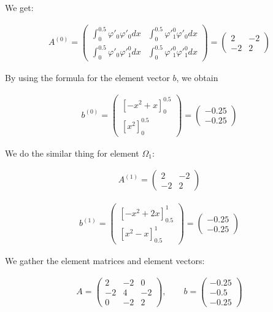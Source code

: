 \documentclass[10pt, a4paper]{amsart}
\numberwithin{figure}{section}
\numberwithin{table}{section}
\begin{document}
We get:

\begin{gather*}
A^{(0)}=
\begin{pmatrix}
\int^{0.5}_{0}\varphi'_0\varphi'_0 dx & \int^{0.5}_{0}\varphi'^0_1\varphi'_0dx\\
    \int^{0.5}_{0}\varphi'_0\varphi'^0_1dx &
    \int^{0.5}_{0}\varphi'^0_1\varphi'^0_1 dx
\end{pmatrix}=
\begin{pmatrix}
2 & -2\\
-2 & 2
\end{pmatrix}
\end{gather*}

By using the formula for the element vector $b$, we obtain

\begin{gather*}
    b^{(0)} = 
    \begin{pmatrix}
        [-x^2 + x]_0^{0.5} \\
        [x^2]_0^{0.5} 
    \end{pmatrix} =
    \begin{pmatrix}
        -0.25\\
        -0.25
    \end{pmatrix}
\end{gather*}


We do the similar thing for element $\Omega_1$:

\begin{gather*}
A^{(1)}=
\begin{pmatrix}
2 & -2\\
-2 & 2
\end{pmatrix}
\end{gather*}

\begin{gather*}
    b^{(1)} = 
    \begin{pmatrix}
        [-x^2 + 2x]_{0.5}^{1} \\
        [x^2 - x]_{0.5}^{1} 
    \end{pmatrix} =
    \begin{pmatrix}
        -0.25\\
        -0.25
    \end{pmatrix}
\end{gather*}

We gather the element matrices and element vectors:

\begin{gather*}
A=
\begin{pmatrix}
2 & -2 &0\\
-2 & 4 & -2\\
0& -2 &2
\end{pmatrix}, \qquad
b=
\begin{pmatrix}
-0.25 \\
-0.5\\
-0.25
\end{pmatrix}
\end{gather*}
\end{document}
